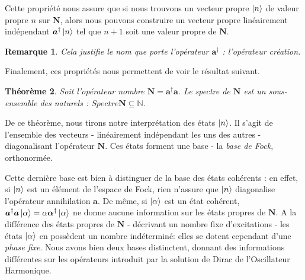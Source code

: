 \documentclass[11pt,oneside,a4paper]{article}
\newtheorem{theorem}{Théorème}[section]
\newtheorem{remark}[theorem]{Remarque}
\begin{document}
Cette propriété nous assure que si nous trouvons un vecteur propre $\ket{n}$ de valeur propre $n$ sur $\bm{N}$, alors nous pouvons construire un vecteur propre linéairement indépendant $\bm{a}^\dagger\ket{n}$ tel que $n+1$ soit une valeur propre de $\bm{N}$.
\begin{remark}
  Cela justifie le nom que porte l'opérateur $\bm{a}^\dagger$ : l'opérateur création.
\end{remark}
Finalement, ces propriétés nous permettent de voir le résultat suivant.
\begin{theorem}
  Soit l'opérateur nombre $\bm{N} = \bm{a}^\dagger\bm{a}$. Le spectre de $\bm{N}$ est un sous-ensemble des naturels : $Spectre \bm{N}\subseteq\mathbb{N}$.
\end{theorem}


De ce théorème, nous tirons notre interprétation des états $\ket{n}$. Il s'agit de l'ensemble des vecteurs - linéairement indépendant les uns des autres - diagonalisant l'opérateur $\bm{N}$. Ces états forment une base - la \emph{base de Fock}, orthonormée. 

Cette dernière base est bien à distinguer de la base des états cohérents : en effet, si $\ket{n}$ est un élément de l'espace de Fock, rien n'assure que $\ket{n}$ diagonalise l'opérateur annihilation $\bm{a}$. De même, si $\ket{\alpha}$ est un état cohérent, $\bm{a}^\dagger \bm{a}\ket{\alpha} = \alpha \bm{\alpha}^\dagger\ket{\alpha}$ ne donne aucune information sur les états propres de $\bm{N}$. A la différence des états propres de $\bm{N}$ - décrivant un nombre fixe d'excitations - les états $\ket{\alpha}$ en possèdent un nombre indéterminé: elles se dotent cependant d'une \emph{phase fixe}. Nous avons bien deux bases distinctent, donnant des informations différentes sur les opérateurs introduit par la solution de Dirac de l'Oscillateur Harmonique.\\
\end{document}
